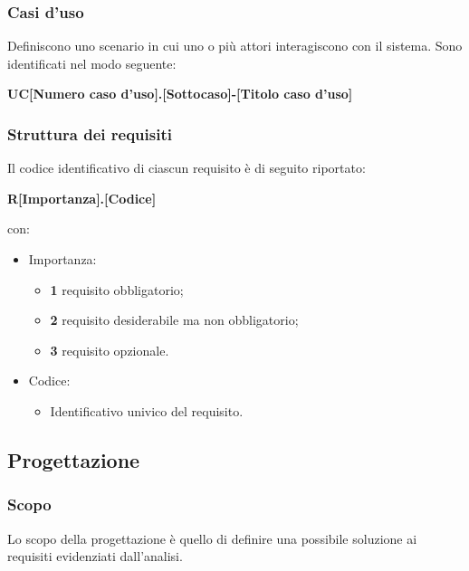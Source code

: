     \subsubsection{Casi d'uso}
    Definiscono uno scenario in cui uno o più attori interagiscono con il sistema. Sono identificati nel modo seguente:
    \begin{center}
      \textbf{UC[Numero caso d'uso].[Sottocaso]-[Titolo caso d'uso]}\\
    \end{center}
    \subsubsection{Struttura dei requisiti}
      Il codice identificativo di ciascun requisito è di seguito riportato:
      \begin{center}
        \textbf{R[Importanza].[Codice]}\\
      \end{center}
      con:
      \begin{itemize}
        \item Importanza:
        \begin{itemize}
          \item \textbf{1} requisito obbligatorio;
          \item \textbf{2} requisito desiderabile ma non obbligatorio;
          \item \textbf{3} requisito opzionale.
        \end{itemize}

        \item Codice:
        \begin{itemize}
          \item Identificativo univico del requisito.
        \end{itemize}
        
      \end{itemize}

  \subsection{Progettazione}
  \subsubsection{Scopo}
  Lo scopo della progettazione è quello di definire una possibile soluzione ai requisiti evidenziati dall'analisi.
